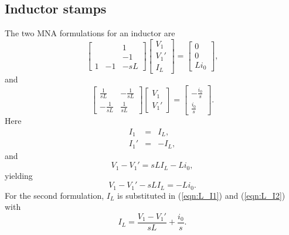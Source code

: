 \documentclass[a4paper, 12pt]{article}
\newcommand{\refeqn}[1]{\mbox{(\ref{eqn:#1})}}
\begin{document}
\subsection{Inductor stamps}

The two MNA formulations for an inductor are
%
\begin{equation}
  \begin{bmatrix}
     &  & 1 \\
     &  & -1 \\
1 & -1 & -sL
  \end{bmatrix}
  \begin{bmatrix}
    V_1 \\ V_1' \\ I_L
  \end{bmatrix}
=
\begin{bmatrix}
  0 \\ 0 \\ L i_0
\end{bmatrix},
\end{equation}
%
and
%
\begin{equation}
  \begin{bmatrix}
    \frac{1}{sL} & -\frac{1}{sL} \\
   -\frac{1}{sL} & \frac{1}{sL}
  \end{bmatrix}
  \begin{bmatrix}
    V_1 \\ V_1'
  \end{bmatrix}
=
\begin{bmatrix}
  -\frac{i_0}{s} \\ \frac{i_0}{s}
\end{bmatrix}.
\end{equation}
%
Here
%
\begin{eqnarray}
\label{eqn:L_I1}
  I_1 & = & I_L, \\
  I_1' & = & -I_L,
\label{eqn:L_I2}
\end{eqnarray}
%
and
%
\begin{equation}
 V_1 - V_1' = s L I_L - L i_0,
\end{equation}
%
yielding
%
\begin{equation}
  V_1 - V_1' - s L I_L = -L i_0.
\end{equation}
%
For the second formulation, $I_L$ is substituted in \refeqn{L_I1} and
\refeqn{L_I2} with
%
\begin{equation}
  I_L = \frac{V_1 - V_1'}{sL} + \frac{i_0}{s}.
\end{equation}
\end{document}
